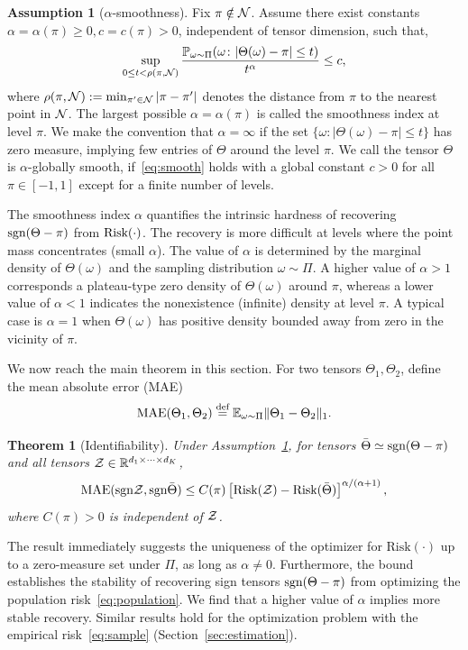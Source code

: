 \documentclass{article}
\theoremstyle{plain}
\newtheorem{thm}{Theorem}[section]
\theoremstyle{definition}
\newtheorem{assumption}{Assumption}
\def\sign{\textup{sgn}}
\def\risk{\textup{Risk}}
\begin{document}

\begin{assumption}[$\alpha$-smoothness]\label{ass:margin} 
Fix $\pi\notin \mathcal{N}$. Assume there exist constants $\alpha=\alpha(\pi)\geq 0, c=c(\pi) >0$, independent of tensor dimension, such that, 
\begin{equation}\label{eq:smooth}
\sup_{0\leq t<\rho(\pi, \mathcal{N})}{\mathbb{P}_{\omega \sim \Pi}(\omega \colon |\Theta (\omega)-\pi|\leq t )\over t^\alpha} \leq c,
\end{equation}
where $\rho(\pi,\mathcal{N}):=\min_{\pi'\in \mathcal{N}}|\pi-\pi'|$ denotes the distance from $\pi$ to the nearest point in $\mathcal{N}$. The largest possible $\alpha=\alpha(\pi)$ is called the smoothness index at level $\pi$. We make the convention that $\alpha= \infty$ if the set $\{\omega\colon |\Theta(\omega)-\pi|\leq t\}$ has zero measure, implying few entries of $\Theta$ around the level $\pi$. We call the tensor $\Theta$ is $\alpha$-globally smooth, if~\eqref{eq:smooth} holds with a global constant $c>0$ for all $\pi\in[-1,1]$ except for a finite number of levels. 
\end{assumption}

The smoothness index $\alpha$ quantifies the intrinsic hardness of recovering $\sign(\Theta-\pi)$ from $\risk(\cdot)$. The recovery is more difficult at levels where the point mass concentrates (small $\alpha$). The value of $\alpha$ is determined by the marginal density of $\Theta(\omega)$ and the sampling distribution $\omega\sim \Pi$. A higher value of $\alpha>1$ corresponds a plateau-type zero density of $\Theta(\omega)$ around $\pi$, whereas a lower value of $\alpha<1$ indicates the nonexistence (infinite) density at level $\pi$. A typical case is $\alpha=1$ when $\Theta(\omega)$ has positive density bounded away from zero in the vicinity of $\pi$. 



We now reach the main theorem in this section. For two tensors $\Theta_1,\Theta_2$, define the mean absolute error (MAE)
\[
\text{MAE}(\Theta_1, \Theta_2)\stackrel{\text{def}}{=}\mathbb{E}_{\omega\sim \Pi}\lVert\Theta_1-\Theta_2\rVert_1.
\]
\begin{thm}[Identifiability] Under Assumption~\ref{ass:margin}, for tensors $\bar \Theta \simeq \sign(\Theta-\pi)$ and all tensors $\mathcal{Z}\in\mathbb{R}^{d_1\times \cdots \times d_K}$,
\[
\textup{MAE}(\sign \tZ, \sign \bar \Theta) \leq C(\pi)\left[\textup{Risk}(\tZ)-\textup{Risk}( \bar \Theta)\right]^{\alpha/(\alpha+1)},
\]
where $C(\pi)>0$ is independent of $\mathcal{Z}$. 
\end{thm}
The result immediately suggests the uniqueness of the optimizer for $\text{Risk}(\cdot)$ up to a zero-measure set under $\Pi$, as long as $\alpha\neq 0$. Furthermore, the bound establishes the stability of recovering sign tensors $\sign (\Theta-\pi)$ from optimizing the population risk~\eqref{eq:population}. We find that a higher value of $\alpha$ implies more stable recovery. Similar results hold for the optimization problem with the empirical risk~\eqref{eq:sample} (Section~\ref{sec:estimation}). 
\end{document}
